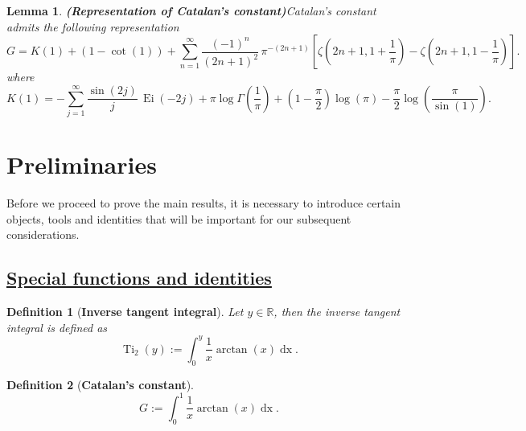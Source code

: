 \documentclass[preprint,12pt,nopreprintline]{elsarticle}
\begin{document}
\vspace{0.2cm}
\newtheorem{lemma}{Lemma}
\begin{lemma}{\textbf{(Representation of Catalan’s constant)}}\label{lem.1}
Catalan's constant admits the following representation
\begin{equation}\label{eq:L1-main}
G
=
K(1)
+
(1-\cot(1))
+
\sum_{n=1}^{\infty}
\frac{(-1)^n}{(2n+1)^2}\,
\pi^{-(2n+1)}
\left[
\zeta\!\left(2n+1,1+\frac{1}{\pi}\right)
-
\zeta\!\left(2n+1,1-\frac{1}{\pi}\right)
\right].
\end{equation}
where
\begin{equation}\label{eq:K1-final-compressed}
K(1)
=
-\sum_{j=1}^{\infty}\frac{\sin(2j)}{j}\,\operatorname{Ei}(-2j)
+\pi\log\Gamma\!\left(\frac{1}{\pi}\right)
+\left(1-\frac{\pi}{2}\right)\log\left(\pi\right)
-\frac{\pi}{2}\log\!\left(\frac{\pi}{\sin \left(1\right
)}\right).
\end{equation}
\end{lemma}

\newpage
\section{Preliminaries}

Before we proceed to prove the main results, it is necessary to introduce certain objects, tools and identities that will be important for our subsequent considerations.
\subsection{\underline{Special functions and identities}}

\newtheorem{definition}{Definition}
\vspace{0.1cm}
\begin{definition}[\textbf{Inverse tangent integral}]\cite{ramanujan1915integral}
\textit{Let $y\in\mathbb{R}$, then the inverse tangent integral is defined as}
\begin{equation}
\nonumber
\operatorname{Ti}_2\left(y\right):=\int_0^y\frac{1}{x}\operatorname{arctan}\left(x\right)\operatorname{dx}.
\end{equation}
\end{definition}

\begin{definition}[\textbf{Catalan’s constant}]
\begin{equation}
\nonumber
G:=\int_0^1\frac{1}{x}\operatorname{arctan}\left(x\right)\operatorname{dx}.
\end{equation}
\end{definition}
\end{document}
